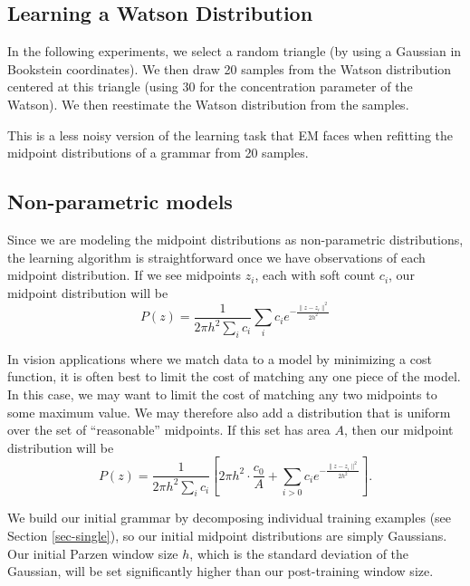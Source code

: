 


\subsection{Learning a Watson Distribution} 


In the following experiments, we select a random triangle (by using a
Gaussian in Bookstein coordinates). We then draw 20 samples from the
Watson distribution centered at this triangle (using 30 for the
concentration parameter of the Watson). We then reestimate the Watson
distribution from the samples.

This is a less noisy version of the learning task that EM faces when
refitting the midpoint distributions of a grammar from 20 samples.



\subsection{Non-parametric models}


Since we are modeling the midpoint distributions as non-parametric
distributions, the learning algorithm is straightforward once we have
observations of each midpoint distribution. If we see midpoints $z_i$,
each with soft count $c_i$, our midpoint distribution will be
$$P(z) = \frac{1}{2\pi h^2\sum_i c_i} \sum_i c_i e^{-\frac{\| z - z_i\|^2}{2h^2}}$$

In vision applications where we match data to a model by minimizing a
cost function, it is often best to limit the cost of matching any one
piece of the model. In this case, we may want to limit the cost of
matching any two midpoints to some maximum value. We may therefore
also add a distribution that is uniform over the set of ``reasonable''
midpoints. If this set has area $A$, then our midpoint distribution
will be
$$P(z) = \frac{1}{2\pi h^2\sum_i c_i} \left[2\pi h^2 \cdot \frac{c_0}{A} + \sum_{i>0} c_i
  e^{-\frac{\| z - z_i\|^2}{2h^2}}\right].$$

We build our initial grammar by decomposing individual training
examples (see Section \ref{sec-single}), so our initial midpoint
distributions are simply Gaussians. Our initial Parzen window size
$h$, which is the standard deviation of the Gaussian, will be set
significantly higher than our post-training window size.

